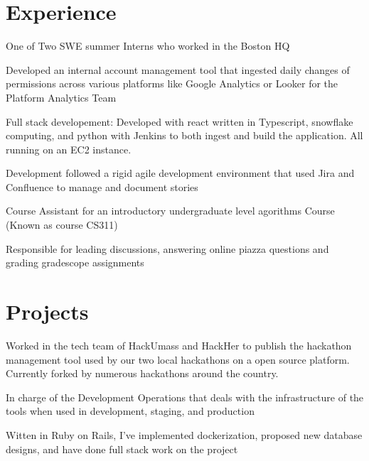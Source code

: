 \section{Experience}

\vspace{10pt}
\begin{tightemize}
    \item One of Two SWE summer Interns who worked in the Boston HQ
    \item Developed an internal account management tool that ingested daily changes of permissions across various platforms like Google Analytics or Looker for the Platform Analytics Team
    \item Full stack developement: Developed with react written in Typescript, snowflake computing, and python with Jenkins to both ingest and build the application. All running on an EC2 instance.
    \item Development followed a rigid agile development environment that used Jira and Confluence to manage and document stories
\end{tightemize}
\sectionsep

\begin{tightemize}
    \item Course Assistant for an introductory undergraduate level agorithms Course (Known as course CS311)
    \item Responsible for leading discussions, answering online piazza questions and grading gradescope assignments
\end{tightemize}
\sectionsep

\section{Projects}
\begin{tightemize}
    \item Worked in the tech team of HackUmass and HackHer to publish the hackathon management tool used by our two local hackathons on a open source platform. Currently forked by numerous hackathons around the country.
    \item In charge of the Development Operations that deals with the infrastructure of the tools when used in development, staging, and production
    \item Witten in Ruby on Rails, I've implemented dockerization, proposed new database designs, and have done full stack work on the project 
\end{tightemize}
\sectionsep

